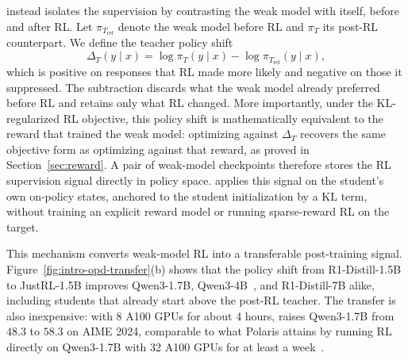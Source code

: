 \method{} instead isolates the supervision by contrasting the weak model with itself, before and after RL. Let $\pi_{T_{\mathrm{ref}}}$ denote the weak model before RL and $\pi_T$ its post-RL counterpart. We define the teacher policy shift
\begin{equation}
    \Delta_T(y \mid x)
    =
    \log \pi_T(y \mid x)
    -
    \log \pi_{T_{\mathrm{ref}}}(y \mid x),
\end{equation}
which is positive on responses that RL made more likely and negative on those it suppressed. The subtraction discards what the weak model already preferred before RL and retains only what RL changed. More importantly, under the KL-regularized RL objective, this policy shift is mathematically equivalent to the reward that trained the weak model: optimizing against $\Delta_T$ recovers the same objective form as optimizing against that reward, as proved in Section~\ref{sec:reward}. A pair of weak-model checkpoints therefore stores the RL supervision signal directly in policy space. \method{} applies this signal on the student's own on-policy states, anchored to the student initialization by a KL term, without training an explicit reward model or running sparse-reward RL on the target.

This mechanism converts weak-model RL into a transferable post-training signal. Figure~\ref{fig:intro-opd-transfer}(b) shows that the policy shift from R1-Distill-1.5B to JustRL-1.5B improves Qwen3-1.7B, Qwen3-4B~\citep{qwen3technicalreport}, and R1-Distill-7B alike, including students that already start above the post-RL teacher. The transfer is also inexpensive: with 8 A100 GPUs for about 4 hours, \method{} raises Qwen3-1.7B from $48.3$ to $58.3$ on AIME 2024, comparable to what Polaris attains by running RL directly on Qwen3-1.7B with 32 A100 GPUs for at least a week~\citep{polaris}.

